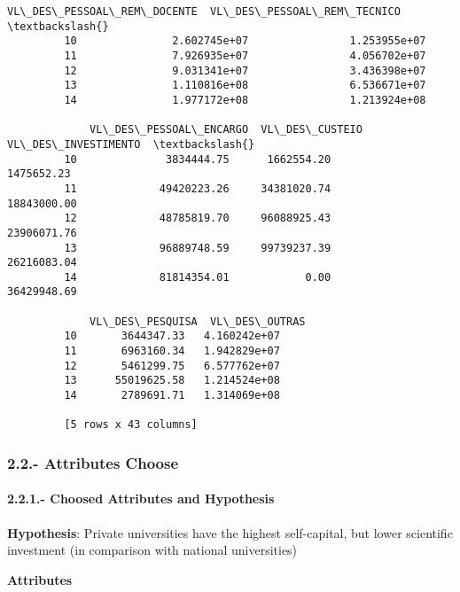 \documentclass[11pt]{article}
\begin{document}
\begin{Verbatim}[commandchars=\\\{\}]
            VL\_DES\_PESSOAL\_REM\_DOCENTE  VL\_DES\_PESSOAL\_REM\_TECNICO  \textbackslash{}
         10               2.602745e+07                1.253955e+07   
         11               7.926935e+07                4.056702e+07   
         12               9.031341e+07                3.436398e+07   
         13               1.110816e+08                6.536671e+07   
         14               1.977172e+08                1.213924e+08   
         
             VL\_DES\_PESSOAL\_ENCARGO  VL\_DES\_CUSTEIO  VL\_DES\_INVESTIMENTO  \textbackslash{}
         10              3834444.75      1662554.20           1475652.23   
         11             49420223.26     34381020.74          18843000.00   
         12             48785819.70     96088925.43          23906071.76   
         13             96889748.59     99739237.39          26216083.04   
         14             81814354.01            0.00          36429948.69   
         
             VL\_DES\_PESQUISA  VL\_DES\_OUTRAS  
         10       3644347.33   4.160242e+07  
         11       6963160.34   1.942829e+07  
         12       5461299.75   6.577762e+07  
         13      55019625.58   1.214524e+08  
         14       2789691.71   1.314069e+08  
         
         [5 rows x 43 columns]
\end{Verbatim}
            
    \subsubsection{2.2.- Attributes Choose}\label{attributes-choose}

    \paragraph{2.2.1.- Choosed Attributes and
Hypothesis}\label{choosed-attributes-and-hypothesis}

\textbf{Hypothesis}: Private universities have the highest self-capital,
but lower scientific investment (in comparison with national
universities)

\textbf{Attributes}
\end{document}
